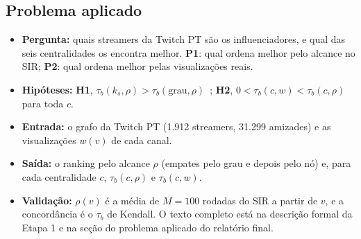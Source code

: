 \subsection{Problema aplicado}
\begin{itemize}[leftmargin=*]
  \item \textbf{Pergunta:} quais streamers da Twitch PT são os influenciadores, e qual das seis
        centralidades os encontra melhor. \textbf{P1}: qual ordena melhor pelo alcance no SIR;
        \textbf{P2}: qual ordena melhor pelas visualizações reais.
  \item \textbf{Hipóteses:} \textbf{H1}, $\tau_b(k_s, \rho) > \tau_b(\text{grau}, \rho)$~\cite{kitsak2010};
        \textbf{H2}, $0 < \tau_b(c, w) < \tau_b(c, \rho)$ para toda $c$.
  \item \textbf{Entrada:} o grafo da Twitch PT (1.912 streamers, 31.299 amizades) e as
        visualizações $w(v)$ de cada canal.
  \item \textbf{Saída:} o ranking pelo alcance $\rho$ (empates pelo grau e depois pelo nó) e, para
        cada centralidade $c$, $\tau_b(c, \rho)$ e $\tau_b(c, w)$.
  \item \textbf{Validação:} $\rho(v)$ é a média de $M = 100$ rodadas do SIR a partir de $v$, e a
        concordância é o $\tau_b$ de Kendall. O texto completo está na descrição formal da Etapa 1
        e na seção do problema aplicado do relatório final.
\end{itemize}

